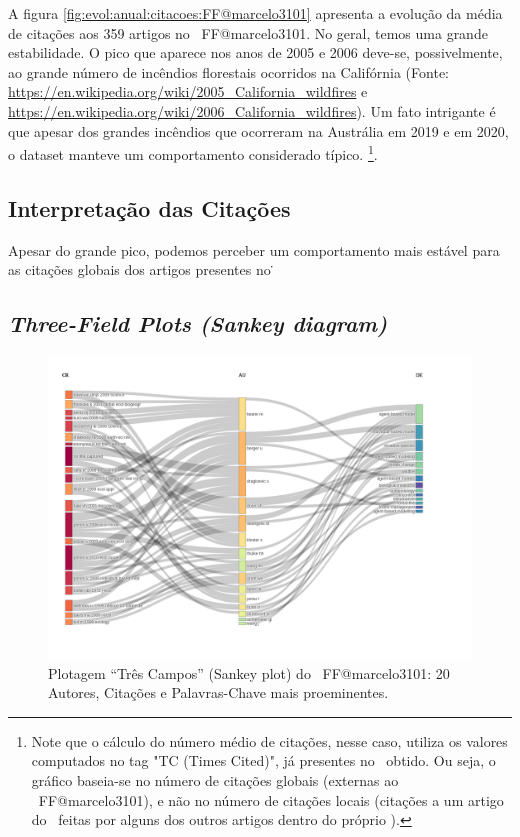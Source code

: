 A figura \ref{fig:evol:anual:citacoes:FF@marcelo3101} apresenta a evolução da média de citações aos 359 artigos no \dataset\   FF@marcelo3101. 
No geral, temos uma grande estabilidade. O pico que aparece nos anos de 2005 e 2006 deve-se, possivelmente, ao grande número de incêndios florestais ocorridos na Califórnia (Fonte: \url{https://en.wikipedia.org/wiki/2005_California_wildfires} e \url{https://en.wikipedia.org/wiki/2006_California_wildfires}). Um fato intrigante é que apesar dos grandes incêndios que ocorreram na Austrália em 2019 e em 2020, o dataset manteve um comportamento considerado típico. \footnote{Note que o cálculo do número  médio de citações, nesse caso, utiliza os valores computados no tag "TC (Times Cited)", já presentes no \dataset\   obtido. Ou seja, o gráfico baseia-se no número de citações globais (externas ao \dataset\   FF@marcelo3101), e não no número de citações locais (citações a um artigo do \dataset\   feitas por alguns dos outros artigos dentro do próprio \dataset).}.

\subsection{Interpretação das Citações}
Apesar do grande pico, podemos perceber um comportamento mais estável para as citações globais dos artigos presentes no \dataset\.

\subsection{\textit{Three-Field Plots (Sankey diagram)} \label{FF@marcelo3101:Sankey}}

\begin{figure}
    \centering
    \includegraphics[angle=0,width=1\textwidth]{exploratory-data-analysis/marcelo3101/PesqBibliogr/ForestFire/WoS-20221204/assets/threeFieldPlotFFmarcelo3101.png}
    \caption{Plotagem ``Três Campos'' (Sankey plot) do \dataset\   FF@marcelo3101: 20 Autores, Citações e Palavras-Chave mais proeminentes.}
    \label{fig:FF@marcelo3101:ThreeFieldPlot}
\end{figure}

